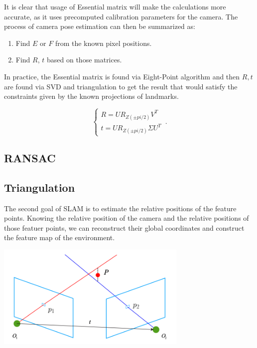 It is clear that usage of Essential matrix will make the calculations more accurate, as it uses precomputed calibration parameters for the camera. 
The process of camera pose estimation can then be summarized as:
\begin{enumerate}
    \item Find $E$ or $F$ from the known pixel positions.
    \item Find $R$, $t$ based on those matrices.
\end{enumerate}

In practice, the Essential matrix is found via Eight-Point algorithm and then $R, t$ are found via SVD and triangulation to get the result that would satisfy the constraints given by the known projections of landmarks.

\begin{equation}
    \begin{cases}
        R = U R_{Z(\pm pi/2)} V^{T}\\
        t = U R_{Z(\pm pi/2)} \Sigma U^{T}
    \end{cases}\,.
\end{equation}

\subsection{RANSAC}


\subsection{Triangulation}

The second goal of SLAM is to estimate the relative positions of the feature points. Knowing the relative position of the camera and the relative positions of those featuer points, we can reconstruct their global coordinates and construct the feature map of the environment. 

\begin{center}
    \includegraphics[height=5cm]{triangulation.png}\\[1cm]
\end{center}

